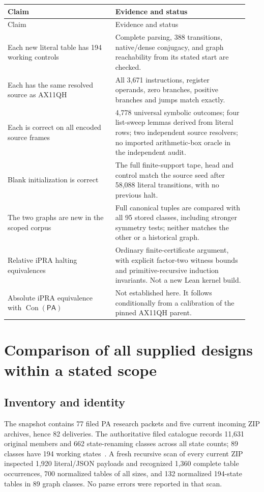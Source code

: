 \documentclass[10pt,letterpaper]{article}
\newcommand{\pa}{\mathsf{PA}}
\newcommand{\Con}{\operatorname{Con}}
\newcommand{\file}[1]{\path{#1}}
\begin{document}
\begin{longtable}{@{}p{0.42\linewidth}p{0.52\linewidth}@{}}
\toprule Claim & Evidence and status\\\midrule\endfirsthead
\toprule Claim & Evidence and status\\\midrule\endhead
Each new literal table has 194 working controls & Complete parsing,
388 transitions, native/dense conjugacy, and graph reachability from its
stated start are checked.\\[4pt]
Each has the same resolved source as AX11QH & All 3,671 instructions,
register operands, zero branches, positive branches and jumps match exactly.\\[4pt]
Each is correct on all encoded source frames & 4,778 universal symbolic
outcomes; four list-sweep lemmas derived from literal rows; two independent
source resolvers; no imported arithmetic-box oracle in the independent audit.\\[4pt]
Blank initialization is correct & The full finite-support tape, head and
control match the source seed after 58,088 literal transitions, with no
previous halt.\\[4pt]
The two graphs are new in the scoped corpus & Full canonical tuples are
compared with all 95 stored classes, including stronger symmetry tests;
neither matches the other or a historical graph.\\[4pt]
Relative iPRA halting equivalences & Ordinary finite-certificate argument,
with explicit factor-two witness bounds and primitive-recursive induction
invariants. Not a new Lean kernel build.\\[4pt]
Absolute iPRA equivalence with $\Con(\pa)$ & Not established here. It follows
conditionally from a calibration of the pinned AX11QH parent.\\
\bottomrule
\end{longtable}

\section{Comparison of all supplied designs within a stated scope}
\label{sec:comparison}

\subsection{Inventory and identity}

The snapshot contains 77 filed PA research packets and five current incoming
ZIP archives, hence 82 deliveries. The authoritative filed catalogue records
11,631 original \file{*.tm} members and 662 state-renaming classes across all
state counts; 89 classes have 194 working states~\cite{catalogue}.
A fresh recursive scan of every current ZIP inspected 1,920 literal/JSON
payloads and recognized 1,360 complete table occurrences, 700 normalized
tables of all sizes, and 132 normalized 194-state tables in 89 graph classes.
No parse errors were reported in that scan.
\end{document}
